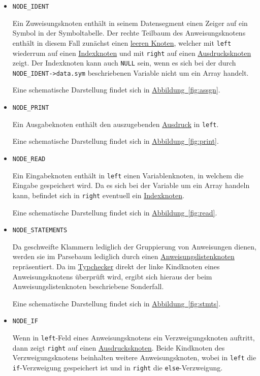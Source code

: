\begin{itemize}
\item \texttt{NODE\_IDENT}

Ein Zuweisungsknoten enthält in seinem Datensegment einen Zeiger auf ein Symbol in der Symboltabelle.
Der rechte Teilbaum des Anweisungsknotens enthält in diesem Fall zunächst einen \hyperref[sec:nonenode]{leeren Knoten},
welcher mit \texttt{left} wiederrum auf einen \hyperref[sec:indexnode]{Indexknoten} und mit \texttt{right} auf einen \hyperref[sec:expnode]{Ausdrucksknoten} zeigt.
Der Indexknoten kann auch \texttt{NULL} sein,
wenn es sich bei der durch \texttt{NODE\_IDENT->data.sym} beschriebenen Variable nicht um ein Array handelt.

Eine schematische Darstellung findet sich in \hyperref[fig:stmtsnode]{Abbildung~\ref{fig:assgn}}.

\item \texttt{NODE\_PRINT}

Ein Ausgabeknoten enthält den auszugebenden \hyperref[sec:expnode]{Ausdruck} in \texttt{left}.

Eine schematische Darstellung findet sich in \hyperref[fig:stmtsnode]{Abbildung~\ref{fig:print}}.

\item \texttt{NODE\_READ}

Ein Eingabeknoten enthält in \texttt{left} einen Variablenknoten,
in welchem die Eingabe gespeichert wird.
Da es sich bei der Variable um ein Array handeln kann,
befindet sich in \texttt{right} eventuell ein \hyperref[sec:indexnode]{Indexknoten}.

Eine schematische Darstellung findet sich in \hyperref[fig:stmtsnode]{Abbildung~\ref{fig:read}}.

\item \texttt{NODE\_STATEMENTS}

Da geschweifte Klammern lediglich der Gruppierung von Anweisungen dienen,
werden sie im Parsebaum lediglich durch einen \hyperref[sec:stmtsnode]{Anweisungslistenknoten} repräsentiert.
Da im \hyperref[sec:typecheck]{Typchecker} direkt der linke Kindknoten eines Anweisungsknotens überprüft wird,
ergibt sich hieraus der beim Anweisungslistenknoten beschriebene Sonderfall.

Eine schematische Darstellung findet sich in \hyperref[fig:stmtsnode]{Abbildung~\ref{fig:stmts}}.

\item \texttt{NODE\_IF}

Wenn in \texttt{left}-Feld eines Anweisungsknotens ein Verzweigungsknoten auftritt,
dann zeigt \texttt{right} auf einen \hyperref[sec:expnode]{Ausdrucksknoten}.
Beide Kindknoten des Verzweigungsknotens beinhalten weitere Anweisungsknoten,
wobei in \texttt{left} die \texttt{if}-Verzweigung gespeichert ist und in \texttt{right} die \texttt{else}-Verzweigung.


\end{itemize}
